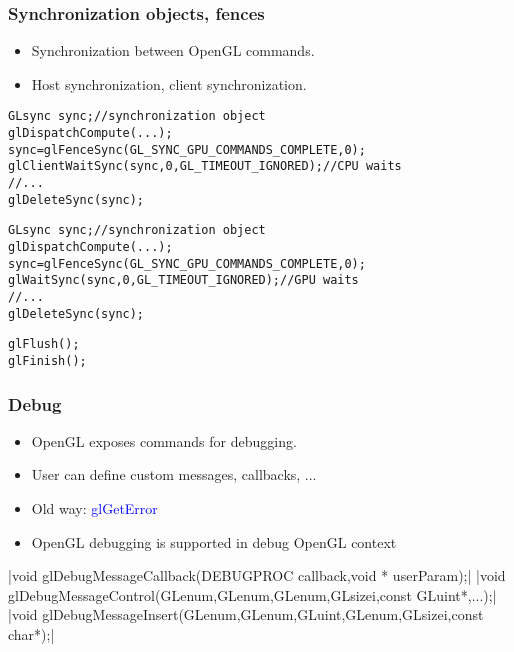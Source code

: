 \begin{frame}[fragile]
\frametitle{Synchronization objects, fences}
  \begin{itemize}
    \item Synchronization between OpenGL commands.
    \item Host synchronization, client synchronization.
  \end{itemize}
	{\scriptsize
	\begin{verbatim}
GLsync sync;//synchronization object
glDispatchCompute(...);
sync=glFenceSync(GL_SYNC_GPU_COMMANDS_COMPLETE,0);
glClientWaitSync(sync,0,GL_TIMEOUT_IGNORED);//CPU waits
//...
glDeleteSync(sync);
	\end{verbatim}
	}
	{\scriptsize
	\begin{verbatim}
GLsync sync;//synchronization object
glDispatchCompute(...);
sync=glFenceSync(GL_SYNC_GPU_COMMANDS_COMPLETE,0);
glWaitSync(sync,0,GL_TIMEOUT_IGNORED);//GPU waits
//...
glDeleteSync(sync);
	\end{verbatim}
	}
	{\scriptsize
	\begin{verbatim}
glFlush();
glFinish();
 	\end{verbatim}
	}
\end{frame}


\begin{frame}
\frametitle{Debug}
	\begin{itemize}
	\item OpenGL exposes commands for debugging.
	\item User can define custom messages, callbacks, ...
	\item Old way: \textcolor{blue}{glGetError}
	\item OpenGL debugging is supported in debug OpenGL context
	\end{itemize}
	{\scriptsize
	|void glDebugMessageCallback(DEBUGPROC callback,void * userParam);|
	|void glDebugMessageControl(GLenum,GLenum,GLenum,GLsizei,const GLuint*,...);|
	|void glDebugMessageInsert(GLenum,GLenum,GLuint,GLenum,GLsizei,const char*);|
	}
\end{frame}

